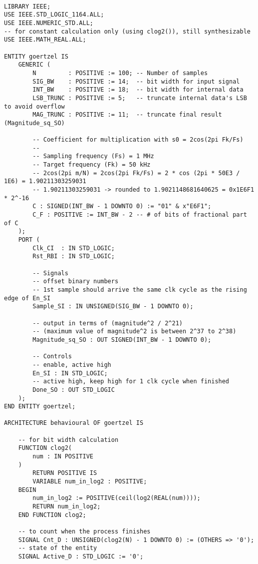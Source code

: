 \lstset{language=VHDL}
\begin{lstlisting}

LIBRARY IEEE;
USE IEEE.STD_LOGIC_1164.ALL;
USE IEEE.NUMERIC_STD.ALL;
-- for constant calculation only (using clog2()), still synthesizable
USE IEEE.MATH_REAL.ALL;

ENTITY goertzel IS
    GENERIC (
        N         : POSITIVE := 100; -- Number of samples
        SIG_BW    : POSITIVE := 14;  -- bit width for input signal
        INT_BW    : POSITIVE := 18;  -- bit width for internal data
        LSB_TRUNC : POSITIVE := 5;   -- truncate internal data's LSB to avoid overflow
        MAG_TRUNC : POSITIVE := 11;  -- truncate final result (Magnitude_sq_SO)

        -- Coefficient for multiplication with s0 = 2cos(2pi Fk/Fs)
        --
        -- Sampling frequency (Fs) = 1 MHz
        -- Target frequency (Fk) = 50 kHz
        -- 2cos(2pi m/N) = 2cos(2pi Fk/Fs) = 2 * cos (2pi * 50E3 / 1E6) = 1.90211303259031
        -- 1.90211303259031 -> rounded to 1.9021148681640625 = 0x1E6F1 * 2^-16
        C : SIGNED(INT_BW - 1 DOWNTO 0) := "01" & x"E6F1";
        C_F : POSITIVE := INT_BW - 2 -- # of bits of fractional part of C
    );
    PORT (
        Clk_CI  : IN STD_LOGIC;
        Rst_RBI : IN STD_LOGIC;

        -- Signals
        -- offset binary numbers
        -- 1st sample should arrive the same clk cycle as the rising edge of En_SI
        Sample_SI : IN UNSIGNED(SIG_BW - 1 DOWNTO 0);

        -- output in terms of (magnitude^2 / 2^21)
        -- (maximum value of magnitude^2 is between 2^37 to 2^38)
        Magnitude_sq_SO : OUT SIGNED(INT_BW - 1 DOWNTO 0);

        -- Controls
        -- enable, active high
        En_SI : IN STD_LOGIC;
        -- active high, keep high for 1 clk cycle when finished
        Done_SO : OUT STD_LOGIC
    );
END ENTITY goertzel;

ARCHITECTURE behavioural OF goertzel IS

    -- for bit width calculation
    FUNCTION clog2(
        num : IN POSITIVE
    )
        RETURN POSITIVE IS
        VARIABLE num_in_log2 : POSITIVE;
    BEGIN
        num_in_log2 := POSITIVE(ceil(log2(REAL(num))));
        RETURN num_in_log2;
    END FUNCTION clog2;

    -- to count when the process finishes
    SIGNAL Cnt_D : UNSIGNED(clog2(N) - 1 DOWNTO 0) := (OTHERS => '0');
    -- state of the entity
    SIGNAL Active_D : STD_LOGIC := '0';


\end{lstlisting}
